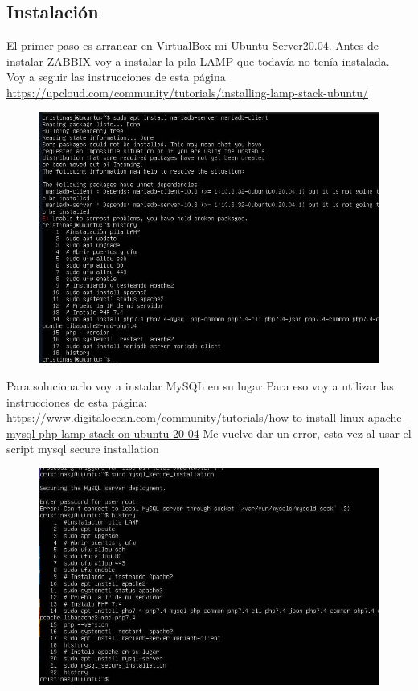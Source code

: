 \subsection{Instalación}
El primer paso es arrancar en VirtualBox mi Ubuntu Server20.04. \newline 
Antes de instalar ZABBIX voy a instalar la pila LAMP que todavía no tenía instalada. Voy a seguir las instrucciones de esta página \url{https://upcloud.com/community/tutorials/installing-lamp-stack-ubuntu/} 
\begin{figure}[H]
\centering
\includegraphics{mariaerror.jpg}
\end{figure} 
Para solucionarlo voy a instalar MySQL en su lugar
\newline 
Para eso voy a utilizar las instrucciones de esta página: \url{https://www.digitalocean.com/community/tutorials/how-to-install-linux-apache-mysql-php-lamp-stack-on-ubuntu-20-04}
Me vuelve dar un error, esta vez al usar el script mysql secure installation
\begin{figure}[H]
\centering
\includegraphics{sqlerror.jpg}
\end{figure}
